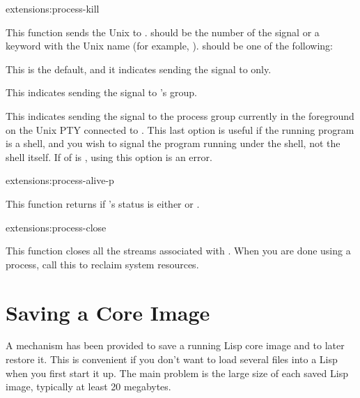 \begin{defun}{extensions:}{process-kill}{%
    }
  
  This function sends the Unix  to .
   should be the number of the signal or a keyword with
  the Unix name (for example, ).   should be
  one of the following:
  \begin{Lentry}
    
  \item[\kwd{pid}] This is the default, and it indicates sending the
    signal to  only.
    
  \item[\kwd{process-group}] This indicates sending the signal to
    's group.
    
  \item[\kwd{pty-process-group}] This indicates sending the signal to
    the process group currently in the foreground on the Unix PTY
    connected to .  This last option is useful if the
    running program is a shell, and you wish to signal the program
    running under the shell, not the shell itself.  If
     of  is \nil, using this option is
    an error.
  \end{Lentry}
\end{defun}

\begin{defun}{extensions:}{process-alive-p}{}
  
  This function returns \true{} if 's status is either
   or .
\end{defun}

\begin{defun}{extensions:}{process-close}{}
  
  This function closes all the streams associated with .
  When you are done using a process, call this to reclaim system
  resources.
\end{defun}


\section{Saving a Core Image}

A mechanism has been provided to save a running Lisp core image and to
later restore it.  This is convenient if you don't want to load several files
into a Lisp when you first start it up.  The main problem is the large
size of each saved Lisp image, typically at least 20 megabytes.

